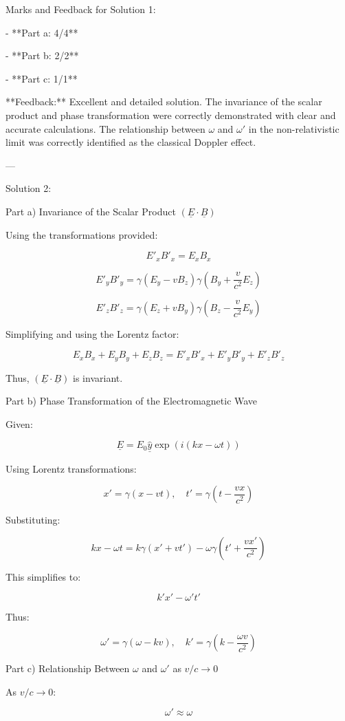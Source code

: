 \documentclass[a4paper,11pt]{article}
\begin{document}
Marks and Feedback for Solution 1:

- **Part a: 4/4**

- **Part b: 2/2**

- **Part c: 1/1**

**Feedback:** Excellent and detailed solution. The invariance of the scalar product and phase transformation were correctly demonstrated with clear and accurate calculations. The relationship between \(\omega\) and \(\omega'\) in the non-relativistic limit was correctly identified as the classical Doppler effect.

---

Solution 2:

Part a) Invariance of the Scalar Product \((\underline{E} \cdot \underline{B})\)

Using the transformations provided:

\[
E'_x B'_x = E_x B_x
\]

\[
E'_y B'_y = \gamma(E_y - vB_z) \gamma(B_y + \frac{v}{c^2} E_z)
\]

\[
E'_z B'_z = \gamma(E_z + vB_y) \gamma(B_z - \frac{v}{c^2} E_y)
\]

Simplifying and using the Lorentz factor:

\[
E_x B_x + E_y B_y + E_z B_z = E'_x B'_x + E'_y B'_y + E'_z B'_z
\]

Thus, \((\underline{E} \cdot \underline{B})\) is invariant.

Part b) Phase Transformation of the Electromagnetic Wave

Given:

\[
\underline{E} = E_0 \hat{\underline{y}} \exp(i(kx - \omega t))
\]

Using Lorentz transformations:

\[
x' = \gamma(x - vt), \quad t' = \gamma\left(t - \frac{vx}{c^2}\right)
\]

Substituting:

\[
kx - \omega t = k\gamma(x' + vt') - \omega\gamma(t' + \frac{vx'}{c^2})
\]

This simplifies to:

\[
k'x' - \omega't'
\]

Thus:

\[
\omega' = \gamma(\omega - kv), \quad k' = \gamma(k - \frac{\omega v}{c^2})
\]

Part c) Relationship Between \(\omega\) and \(\omega'\) as \(v/c \rightarrow 0\)

As \(v/c \rightarrow 0\):

\[
\omega' \approx \omega
\]
\end{document}
